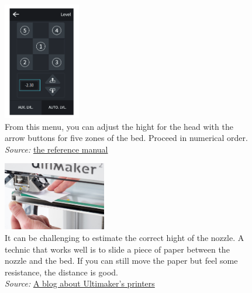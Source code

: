 \documentclass[a4paper,11pt]{article}
\begin{document}
\begin{figure}[H]
    \centering 
    \includegraphics[width=0.3\textwidth]{img/ender/3.png} 
    \caption{From this menu, you can adjust the hight for the head with the arrow buttons for five zones of the bed. Proceed in numerical order.\\ \textit{Source:} \href{https://img.staticdj.com/8f39f619af6bf34e5afb36ddbf2a0229.pdf?spm=..page\_1995605.download\_support\_1.1\&spm\_prev=..product\_5e45abfb-4541-4c92-ba93-cfba9a1e3ea4.nav\_link\_store\_1.1}{the reference manual}}
    \label{fig:ender3}
\end{figure}

\begin{figure}[H]
    \centering 
    \includegraphics[width=0.4\textwidth]{img/ender/4.jpg} 
    \caption{It can be challenging to estimate the correct hight of the nozzle. A technic that works well is to slide a piece of paper between the nozzle and the bed. If you can still move the paper but feel some resistance, the distance is good.\\ 
    \textit{Source:} \href{https://blog.discoverthat.co.uk/2015/06/calibrate-3d-printer.html}{A blog about Ultimaker's printers}}
    \label{fig:ender4}
\end{figure}
\end{document}
